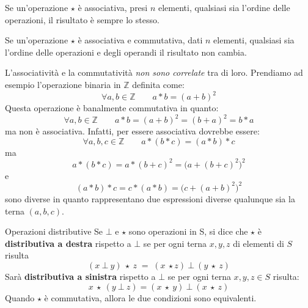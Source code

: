 \begin{teorbox}
	Se un'operazione $\star$ è associativa, presi $n$ elementi, qualsiasi sia l'ordine delle operazioni, il risultato è sempre lo stesso.
\end{teorbox}


\begin{teorbox}
	Se un'operazione $\star$ è associativa e commutativa, dati $n$ elementi, qualsiasi sia l'ordine delle operazioni e degli operandi il risultato non cambia.
\end{teorbox}

\begin{example}
	L'associatività e la commutatività \textit{non sono correlate} tra di loro. Prendiamo ad esempio l'operazione binaria in $\mathbb{Z}$ definita come:
	\begin{displaymath}
		\forall a,b \in \mathbb{Z} \qquad a \ast b = (a+b)^{2}
	\end{displaymath}
	Questa operazione è banalmente commutativa in quanto:
	\begin{displaymath}
		\forall a,b \in \mathbb{Z} \qquad a \ast b = (a+b)^{2}=(b+a)^{2}=b \ast a
	\end{displaymath}
	ma non è associativa. Infatti, per essere associativa dovrebbe essere:
	\begin{displaymath}
		\forall a,b,c \in \mathbb{Z} \qquad a \ast (b \ast c) = (a \ast b) \ast c
	\end{displaymath}
	ma $$a \ast (b \ast c) = a \ast (b+c)^{2} = \bigl(a + (b+c)^{2}\bigr)^{2}$$
	e $$(a \ast b) \ast c = c \ast (a \ast b) = \bigl(c + (a+b)^{2}\bigr)^{2} $$
	sono diverse in quanto rappresentano due espressioni diverse qualunque sia la terna $(a,b,c)$.
\end{example}

\begin{defbox}{Operazioni distributive}
	Se $\bot$ e $\star$ sono operazioni in S, si dice che $\star$ è \textbf{distributiva a destra} rispetto a $\bot$ se per ogni terna $x,y,z$ di elementi di $S$ risulta
	\begin{equation}
		(x\: \bot \: y)\: \star \: z \;=\;(x \: \star z)\: \bot \: (y \: \star \: z)
	\end{equation}
Sarà \textbf{distributiva a sinistra} rispetto a $\bot$ se per ogni terna $x,y,z \in S$ risulta:
\begin{equation}
	x \ \star \ (y \ \bot \ z) = (x  \ \star \ y) \ \bot \ (x \ \star \ z) 
\end{equation}
Quando $\star$ è commutativa, allora le due condizioni sono equivalenti.
\end{defbox}

